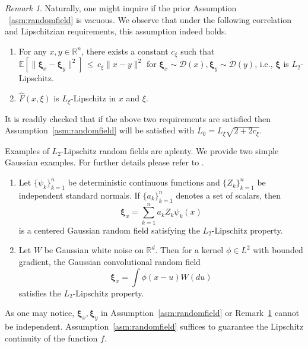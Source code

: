 \documentclass[11pt,reqno]{amsart}
\newcommand{\1}{{\bf 1}}
\newcommand{\2}{{\bf 2}}
\newcommand{\pc}[1]{{\color{cyan}#1}}
\newcommand{\us}[1]{\textcolor{red}{#1}}
\newcommand{\bxi}{\boldsymbol{\xi}}
\newcommand{\R}{\mathbb R}
\numberwithin{equation}{section}
\theoremstyle{remark}
\newtheorem{remark}{Remark}[section]
\begin{document}
{				
				\begin{remark}\label{ass:f-hat-Lip-DD2}
					Naturally, one might inquire if the prior Assumption ~\ref{asm:randomfield} is vacuous. We observe that under the following correlation and Lipschitzian requirements, this assumption indeed holds. 
					\begin{enumerate}
						\item\label{ass:DD2-xi} For any $x,y\in \R^n$, there exists a constant $c_{\xi}$ such that $\mathbb{E}[\|\bxi_x-\bxi_y\|^2] \, \leq \, c_{\xi} \|x-y\|^2$ for $\bxi_x \sim \mathcal{D}(x),\bxi_y \sim \mathcal{D}(y)$, i.e.,   $\bxi$ is $L_2$-Lipschitz. 
						\item $\hat{F}(x,\xi)$ is $L_\xi$-Lipschitz in $x$ and $\xi$.
					\end{enumerate}
					It is readily checked that if the above two requirements are satisfied then Assumption~\ref{asm:randomfield} will be satisfied with $L_0=L_\xi\sqrt{2+2c_\xi}$. 
					 
				\end{remark}
				\medskip
				Examples of $L_2$-Lipschitz random fields are aplenty. We provide two simple Gaussian examples. For further details please refer to \cite{gaussian-processes-ml}.\\
				\begin{enumerate}[wide, labelindent = 0pt, label = (\roman*)]
					\item {Let $\{\psi_k\}_{k=1}^n$ be deterministic continuous functions and $\{Z_k\}_{k=1}^n$ be independent standard normals}. {If $\{a_k\}_{k=1}^n$ denotes a set of scalars, then }
					$$\bxi_x = \sum_{k=1}^n a_k Z_k \psi_k(x)$$
					is a centered Gaussian random field satisfying the $L_2$-Lipschitz property.
					\item Let $W$ be Gaussian white noise on $\R^d$. Then for a kernel $\phi \in L^2$ with bounded gradient, the Gaussian convolutional random field
					$$\bxi_x = \int \phi(x-u) W(du)$$
					satisfies the $L_2$-Lipschitz property.
				\end{enumerate}
				
				As one may notice, $\bxi_x,\bxi_y$ in Assumption~\ref{asm:randomfield} or Remark~\ref{ass:f-hat-Lip-DD2} cannot be independent. Assumption~\ref{asm:randomfield}  suffices to guarantee the Lipschitz continuity of the function $f$. 
				
}
\end{document}
